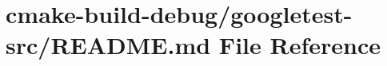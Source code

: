 \hypertarget{cmake-build-debug_2googletest-src_2README_8md}{}\section{cmake-\/build-\/debug/googletest-\/src/\+R\+E\+A\+D\+ME.md File Reference}
\label{cmake-build-debug_2googletest-src_2README_8md}
